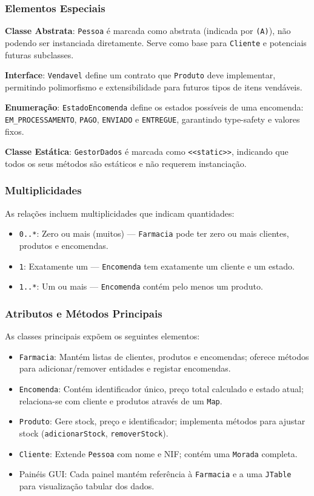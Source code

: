 \documentclass[a4paper,12pt]{article}
\begin{document}
\subsubsection{Elementos Especiais}

\textbf{Classe Abstrata}: \texttt{Pessoa} é marcada como abstrata (indicada por \texttt{(A)}), não podendo ser instanciada diretamente. Serve como base para \texttt{Cliente} e potenciais futuras subclasses.

\textbf{Interface}: \texttt{Vendavel} define um contrato que \texttt{Produto} deve implementar, permitindo polimorfismo e extensibilidade para futuros tipos de itens vendáveis.

\textbf{Enumeração}: \texttt{EstadoEncomenda} define os estados possíveis de uma encomenda: \texttt{EM\_PROCESSAMENTO}, \texttt{PAGO}, \texttt{ENVIADO} e \texttt{ENTREGUE}, garantindo type-safety e valores fixos.

\textbf{Classe Estática}: \texttt{GestorDados} é marcada como \texttt{<<static>>}, indicando que todos os seus métodos são estáticos e não requerem instanciação.

\subsubsection{Multiplicidades}
As relações incluem multiplicidades que indicam quantidades:
\begin{itemize}
    \item \texttt{0..*}: Zero ou mais (muitos) — \texttt{Farmacia} pode ter zero ou mais clientes, produtos e encomendas.
    \item \texttt{1}: Exatamente um — \texttt{Encomenda} tem exatamente um cliente e um estado.
    \item \texttt{1..*}: Um ou mais — \texttt{Encomenda} contém pelo menos um produto.
\end{itemize}

\subsubsection{Atributos e Métodos Principais}
As classes principais expõem os seguintes elementos:
\begin{itemize}
    \item \texttt{Farmacia}: Mantém listas de clientes, produtos e encomendas; oferece métodos para adicionar/remover entidades e registar encomendas.
    \item \texttt{Encomenda}: Contém identificador único, preço total calculado e estado atual; relaciona-se com cliente e produtos através de um \texttt{Map}.
    \item \texttt{Produto}: Gere stock, preço e identificador; implementa métodos para ajustar stock (\texttt{adicionarStock}, \texttt{removerStock}).
    \item \texttt{Cliente}: Extende \texttt{Pessoa} com nome e NIF; contém uma \texttt{Morada} completa.
    \item Painéis GUI: Cada painel mantém referência à \texttt{Farmacia} e a uma \texttt{JTable} para visualização tabular dos dados.
\end{itemize}
\end{document}
